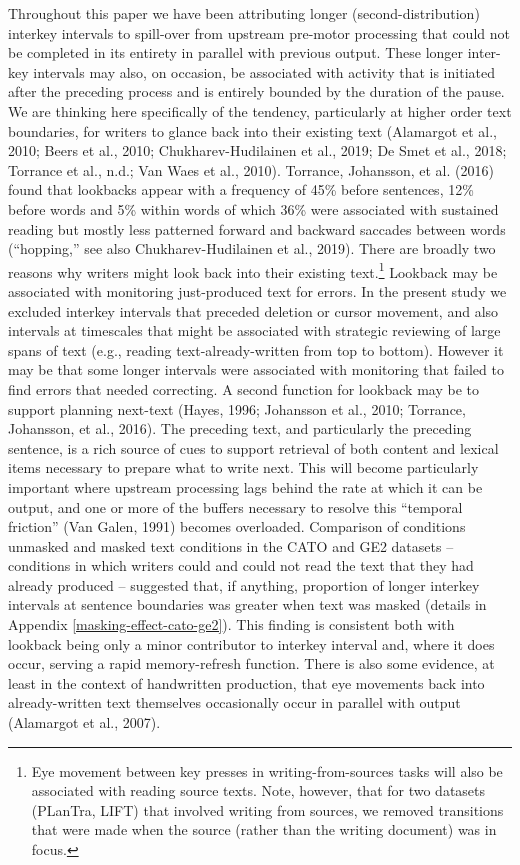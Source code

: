 \documentclass[
  man,floatsintext]{apa7}
\begin{document}
Throughout this paper we have been attributing longer (second-distribution) interkey intervals to spill-over from upstream pre-motor processing that could not be completed in its entirety in parallel with previous output. These longer inter-key intervals may also, on occasion, be associated with activity that is initiated after the preceding process and is entirely bounded by the duration of the pause. We are thinking here specifically of the tendency, particularly at higher order text boundaries, for writers to glance back into their existing text (Alamargot et al., 2010; Beers et al., 2010; Chukharev-Hudilainen et al., 2019; De Smet et al., 2018; Torrance et al., n.d.; Van Waes et al., 2010). Torrance, Johansson, et al. (2016) found that lookbacks appear with a frequency of 45\% before sentences, 12\% before words and 5\% within words of which 36\% were associated with sustained reading but mostly less patterned forward and backward saccades between words (\enquote{hopping,} see also Chukharev-Hudilainen et al., 2019). There are broadly two reasons why writers might look back into their existing text.\footnote{Eye movement between key presses in writing-from-sources tasks will also be associated with reading source texts. Note, however, that for two datasets (PLanTra, LIFT) that involved writing from sources, we removed transitions that were made when the source (rather than the writing document) was in focus.} Lookback may be associated with monitoring just-produced text for errors. In the present study we excluded interkey intervals that preceded deletion or cursor movement, and also intervals at timescales that might be associated with strategic reviewing of large spans of text (e.g., reading text-already-written from top to bottom). However it may be that some longer intervals were associated with monitoring that failed to find errors that needed correcting. A second function for lookback may be to support planning next-text (Hayes, 1996; Johansson et al., 2010; Torrance, Johansson, et al., 2016). The preceding text, and particularly the preceding sentence, is a rich source of cues to support retrieval of both content and lexical items necessary to prepare what to write next. This will become particularly important where upstream processing lags behind the rate at which it can be output, and one or more of the buffers necessary to resolve this \enquote{temporal friction} (Van Galen, 1991) becomes overloaded. Comparison of conditions unmasked and masked text conditions in the CATO and GE2 datasets -- conditions in which writers could and could not read the text that they had already produced -- suggested that, if anything, proportion of longer interkey intervals at sentence boundaries was greater when text was masked (details in Appendix \ref{masking-effect-cato-ge2}). This finding is consistent both with lookback being only a minor contributor to interkey interval and, where it does occur, serving a rapid memory-refresh function. There is also some evidence, at least in the context of handwritten production, that eye movements back into already-written text themselves occasionally occur in parallel with output (Alamargot et al., 2007).
\end{document}
